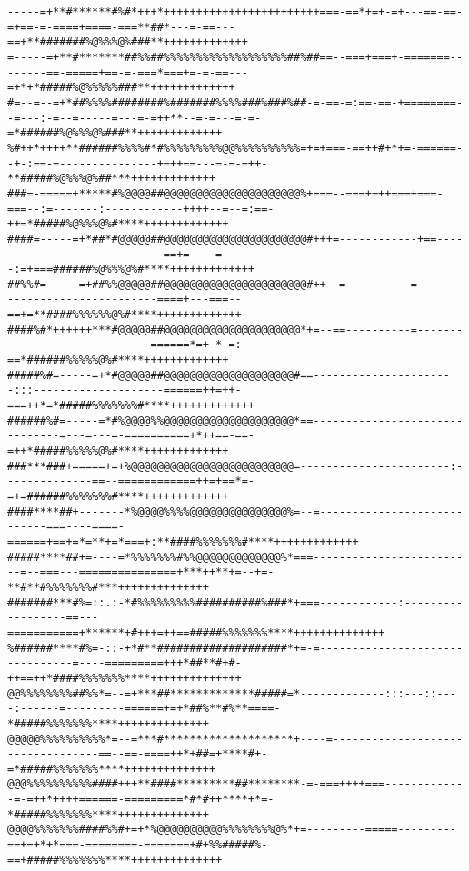\documentclass[a4paper, 12pt, oneside]{article}
\begin{document}
\begin{verbatim}
-----=+**#******#%#*+++*++++++++++++++++++++++++===-==*+=+-=+---==-==-=+==-=-====+====-===**##*---=-==---==+**#######%@%%%@%###**+++++++++++++
=-----=+**#*******##%%##%%%%%%%%%%%%%%%%%%%##%##==--===+===+-=======--------==-=====+==-=-===*===+=-=-==---=+*+*#####%@%%%%%###**+++++++++++++
#=--=--=+*##%%%%########%#######%%%%###%###%##-=-==-=:==-==-+========--=---:-=--=-----=---=-=++**--=-=---=-=-=*######%@%%%@%###**+++++++++++++
%#++*++++**######%%%%#*#%%%%%%%%%@@%%%%%%%%%%=+=+===-==++#+*+=-======--+-:==-=---------------+=++==---=-=-=++-**#####%@%%%@%##***+++++++++++++
###=-=====+*****#%@@@@##@@@@@@@@@@@@@@@@@@@@@%+===--===+=++===+===-===--:=-------:------------++++--=--=:==-++=*#####%@%%%@%#****+++++++++++++
####=-----=+*##*#@@@@@##@@@@@@@@@@@@@@@@@@@@@@#+++=------------+==----------------------------==+=----=--:=+===######%@%%%@%#****+++++++++++++
##%%#=-----=+##%%@@@@@##@@@@@@@@@@@@@@@@@@@@@@#++--=----------=------------------------------====+---===--==+=**####%%%%%%@%#****+++++++++++++
####%#*++++++***#@@@@@##@@@@@@@@@@@@@@@@@@@@@*+=--==----------=-----------------------------======*=+-*-=:--==*######%%%%%@%#****+++++++++++++
#####%#=-----=+*#@@@@@##@@@@@@@@@@@@@@@@@@@@#==----------------------:::--------------------======++=++-===++*=*#####%%%%%%%#****+++++++++++++
######%#=-----=*#%@@@@%%@@@@@@@@@@@@@@@@@@@@*==-------------------------------=---=---=-==========+*++==-==-=++*#####%%%%%@%#****+++++++++++++
###***###+=====+=+%@@@@@@@@@@@@@@@@@@@@@@@@@=-----------------------:--------------==--============++=+==*=-=+=######%%%%%%%#****+++++++++++++
####****##+-------*%@@@@%%%%@@@@@@@@@@@@@@@%=--=----------------------------===----====-======+==+=*=**+=*===+:**####%%%%%%%#****+++++++++++++
#####****##+=----=*%%%%%%%#%%@@@@@@@@@@@@@%*===-------------------------=--===---===============+***++**+=--+=-**#**#%%%%%%%#***++++++++++++++
#######***#%=::.:-*#%%%%%%%%%##########%###*+===------------:------------------==---===========+******+#+++=++==#####%%%%%%%****++++++++++++++
%######****#%=-::-+*#**####################*+=-=--------------------------------=----=========+++*##**#+#-++==++*####%%%%%%%****++++++++++++++
@@%%%%%%%%##%%*=--=+***##*************#####=*-------------:::---::----:------=---------======+=+*##%**#%**====-*#####%%%%%%%****++++++++++++++
@@@@@%%%%%%%%%%*=--=***#********************+----=----------------------------------==--==-====++*+##=+****#+-=*#####%%%%%%%****++++++++++++++
@@@%%%%%%%%%%####+++**####*********##********-=-===++++===-------------=-=++*++++======-=========*#*#++****+*=-*#####%%%%%%%****++++++++++++++
@@@@%%%%%%%####%%#+=+*%@@@@@@@@@@%%%%%%%%@%*+=---------=====---------==+=+*+*===-========-=======+#+%%#####%-==+#####%%%%%%%****++++++++++++++

\end{verbatim}
\end{document}
